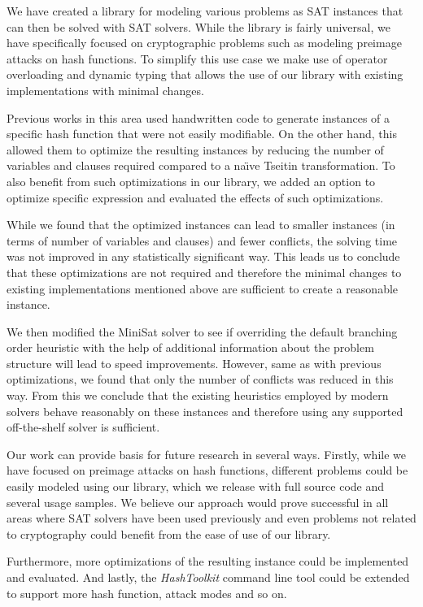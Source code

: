 We have created a library for modeling various problems as SAT instances that can then be solved with SAT solvers.
While the library is fairly universal, we have specifically focused on cryptographic problems such as modeling preimage attacks on hash functions.
To simplify this use case we make use of operator overloading and dynamic typing that allows the use of our library with existing implementations with minimal changes.

Previous works in this area used handwritten code to generate instances of a specific hash function that were not easily modifiable.
On the other hand, this allowed them to optimize the resulting instances by reducing the number of variables and clauses required compared to a na\"{\i}ve Tseitin transformation.
To also benefit from such optimizations in our library, we added an option to optimize specific expression and evaluated the effects of such optimizations.

While we found that the optimized instances can lead to smaller instances (in terms of number of variables and clauses) and fewer conflicts, the solving time was not improved in any statistically significant way.
This leads us to conclude that these optimizations are not required and therefore the minimal changes to existing implementations mentioned above are sufficient to create a reasonable instance.

We then modified the MiniSat solver to see if overriding the default branching order heuristic with the help of additional information about the problem structure will lead to speed improvements.
However, same as with previous optimizations, we found that only the number of conflicts was reduced in this way.
From this we conclude that the existing heuristics employed by modern solvers behave reasonably on these instances and therefore using any supported off-the-shelf solver is sufficient.

Our work can provide basis for future research in several ways.
Firstly, while we have focused on preimage attacks on hash functions, different problems could be easily modeled using our library, which we release with full source code and several usage samples.
We believe our approach would prove successful in all areas where SAT solvers have been used previously and even problems not related to cryptography could benefit from the ease of use of our library.

Furthermore, more optimizations of the resulting instance could be implemented and evaluated.
And lastly, the \emph{HashToolkit} command line tool could be extended to support more hash function, attack modes and so on.